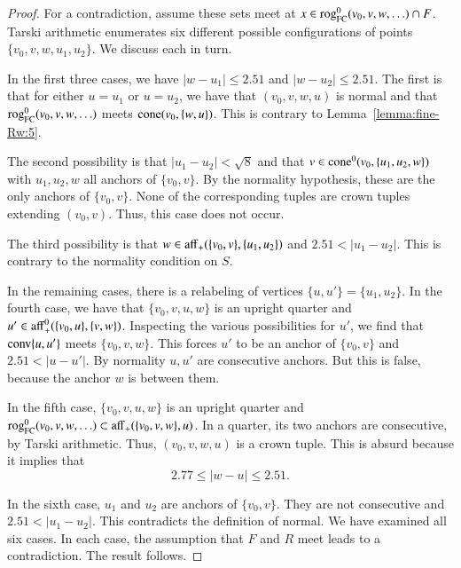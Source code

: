 \begin{proof}
For a contradiction, assume these sets meet at $x\in {\operatorname{rog}}^0_{\text{FC}}(v_0,v,w,\ldots)\cap F$.
Tarski arithmetic enumerates six different possible
configurations of points $\{v_0,v,w,u_1,u_2\}$.  We discuss each
in turn.

In the first three cases, 
%
we have $|w-u_1|\le 2.51$ and $|w-u_2|\le 2.51$.  The first is that
for either $u=u_1$ or $u=u_2$, we have that $(v_0,v,w,u)$ is normal
and that ${\operatorname{rog}}^0_{\text{FC}}(v_0,v,w,\ldots)$ meets ${\operatorname{cone}}(v_0,\{w,u\})$.  This is contrary to
Lemma~\ref{lemma:fine-Rw:5}.

The second possibility is that
$|u_1-u_2|<\sqrt8$ and that $v\in{\operatorname{cone}}^0(v_0,\{u_1,u_2,w\})$
with $u_1,u_2,w$ all anchors of $\{v_0,v\}$.  By the normality
hypothesis, these are the only anchors of $\{v_0,v\}$.  None of the
corresponding tuples are crown tuples extending
$(v_0,v)$.  Thus, this case does not
occur. 

The third possibility is that $w\in {\operatorname{aff}}_+(\{v_0,v\},\{u_1,u_2\})$
and $2.51<|u_1-u_2|$.  This is contrary to the normality
condition on $S$.

In the remaining cases, there is a 
relabeling of vertices $\{u,u'\}=\{u_1,u_2\}$.
In the fourth case, we have that $\{v_0,v,u,w\}$ is an upright
quarter and $u'\in {\operatorname{aff}}_+^0(\{v_0,u\},\{v,w\})$.  Inspecting
the various possibilities for $u'$, we find that
${\operatorname{conv}}\{u,u'\}$ meets $\{v_0,v,w\}$.  This forces $u'$ to be
an anchor of $\{v_0,v\}$ and $2.51 < |u-u'|$.  By normality
$u,u'$ are consecutive anchors.  But this is false, because the
anchor  $w$ is between them.

In the fifth case, $\{v_0,v,u,w\}$ is an upright quarter and
${\operatorname{rog}}^0_{\text{FC}}(v_0,v,w,\ldots)\subset {\operatorname{aff}}_+(\{v_0,v,w\},u)$.  
In a quarter, its two anchors are consecutive, by Tarski arithmetic.  Thus,
$(v_0,v,w,u)$ is a crown tuple.  This is absurd because it implies that
  $$
   2.77 \le |w-u| \le 2.51.
  $$

In the sixth case, $u_1$ and $u_2$ are anchors of $\{v_0,v\}$.
They are not consecutive and $2.51 < |u_1-u_2|$.  This contradicts
the definition of normal.
We have examined all six cases.  In each case, the assumption
that $F$ and $R$ meet leads to a contradiction.  The result follows.
\end{proof}

